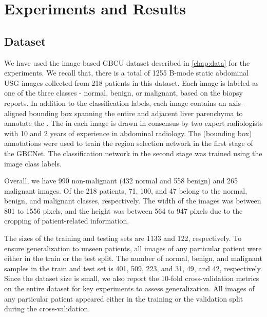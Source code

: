 \section{Experiments and Results}
%
\subsection{Dataset}
%
We have used the image-based GBCU dataset described in \cref{chap:data} for the experiments. We recall that, there is a total of 1255 B-mode static abdominal USG images collected from 218 patients in this dataset. Each image is labeled as one of the three classes - normal, benign, or malignant, based on the biopsy reports. In addition to the classification labels, each image contains an axis-aligned bounding box spanning the entire \gb and adjacent liver parenchyma to annotate the \roi. The \roi in each image is drawn in consensus by two expert radiologists with 10 and 2 years of experience in abdominal radiology. The \roi (bounding box) annotations were used to train the \gb region selection network in the first stage of the GBCNet. The classification network in the second stage was trained using the image class labels. 

%
Overall, we have 990 non-malignant (432 normal and 558 benign) and 265 malignant images. Of the 218 patients, 71, 100, and 47 belong to the normal, benign, and malignant classes, respectively. The width of the images was between 801 to 1556 pixels, and the height was between 564 to 947 pixels due to the cropping of patient-related information. 

%
The sizes of the training and testing sets are 1133 and 122, respectively. To ensure generalization to unseen patients, all images of any particular patient were either in the train or the test split. The number of normal, benign, and malignant samples in the train and test set is 401, 509, 223, and 31, 49, and 42, respectively. 
Since the dataset size is small, we also report the 10-fold cross-validation metrics on the entire dataset for key experiments to assess generalization. All images of any particular patient appeared either in the training or the validation split during the cross-validation. 

